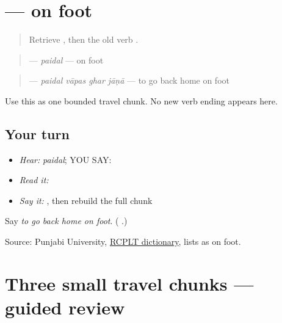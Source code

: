 \section[\texorpdfstring{\pa{ਪੈਦਲ} (paidal)}{ਪੈਦਲ (paidal)}]{ — on foot}

\label{lesson:PA-C181-paidal}



\begin{quote}
Retrieve \textbf{ }, then the old verb \textbf{}.
\end{quote}

\begin{grammarlens}[title={Grammar Lens: one way of travelling}]
\begin{quote}
\textbf{} — \emph{paidal} — on foot
\end{quote}

\begin{quote}
\textbf{   } — \emph{paidal vāpas ghar jāṇā} — to go back home on foot
\end{quote}

Use this as one bounded travel chunk. No new verb ending appears here.
\end{grammarlens}

\subsection*{Your turn}
\begin{itemize}
\raggedright
  \item \emph{Hear:} \emph{paidal}; YOU SAY: \textbf{}
  \item \emph{Read it:} \textbf{   }
  \item \emph{Say it:} \textbf{ }, then rebuild the full chunk
\end{itemize}

\begin{tcolorbox}[breakable,colback=teal!4,colframe=teal!35!black,title={Before you move on}]
Say \emph{to go back home on foot}. (\textbf{   }.)

Source: Punjabi University, \href{https://dic.learnpunjabi.org/default.aspx?look=\%E0\%A8\%AA\%E0\%A9\%88\%E0\%A8\%A6\%E0\%A8\%B2}{RCPLT dictionary}, lists \textbf{} as on foot.
\end{tcolorbox}
\section[\texorpdfstring{\pa{ਰੇਲ} \pa{ਦੀ} \pa{ਟਿਕਟ} · \pa{ਰੇਲ} … (rel di tikat …)}{ਰੇਲ ਦੀ ਟਿਕਟ · ਰੇਲ … (rel di tikat …)}]{Three small travel chunks — guided review}

